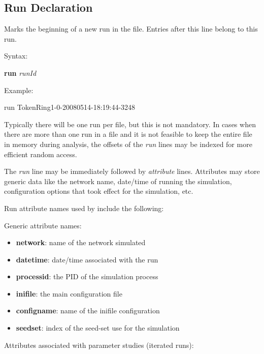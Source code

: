 \subsection{Run Declaration}
\label{sec:result-file-formats:opp:run-declaration}

Marks the beginning of a new run in the file. Entries after this line
belong to this run.

Syntax:

\hspace{20mm} \textbf{run} \textit{runId}

Example:

\begin{filelisting}
run TokenRing1-0-20080514-18:19:44-3248
\end{filelisting}

Typically there will be one run per file, but this is not mandatory.
In cases when there are more than one run in a file and it is not feasible
to keep the entire file in memory during analysis, the offsets of the \textit{run}
lines may be indexed for more efficient random access.

The \textit{run} line may be immediately followed by \textit{attribute} lines.
Attributes may store generic data like the network name, date/time of running
the simulation, configuration options that took effect for the simulation, etc.

Run attribute names used by {\opp} include the following:

Generic attribute names:

\begin{itemize}
    \item \textbf{network}: name of the network simulated
    \item \textbf{datetime}: date/time associated with the run
    \item \textbf{processid}: the PID of the simulation process
    \item \textbf{inifile}: the main configuration file
    \item \textbf{configname}: name of the inifile configuration
    \item \textbf{seedset}: index of the seed-set use for the simulation
\end{itemize}

Attributes associated with parameter studies (iterated runs):

